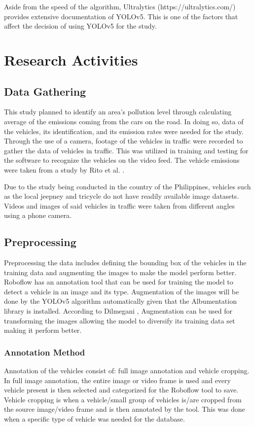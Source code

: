 Aside from the speed of the algorithm, Ultralytics (https://ultralytics.com/) provides extensive documentation of YOLOv5. This is one of the factors that affect the decision of using YOLOv5 for the study.


\section{Research Activities}


\subsection {Data Gathering}
This study planned to identify an area’s pollution level through calculating average of the emissions coming from the cars on the road. In doing so, data of the vehicles, its identification, and its emission rates were needed for the study. Through the use of a camera, footage of the vehicles in traffic were recorded to gather the data of vehicles in traffic. This was utilized in training and testing for the software to recognize the vehicles on the video feed. The vehicle emissions were taken from a study by Rito et al. \citeyear{rito_lopez_biona_2021}.

Due to the study being conducted in the country of the Philippines, vehicles such as the local jeepney and tricycle do not have readily available image datasets. Videos and images of said vehicles in traffic were taken from different angles using a phone camera. 


\subsection {Preprocessing}

	Preprocessing the data includes defining the bounding box of the vehicles in the training data and augmenting the images to make the model perform better. Roboflow has an annotation tool that can be used for  training the model to detect a vehicle in an image and its type. Augmentation of the images will be done by the YOLOv5 algorithm automatically given that the Albumentation library is installed. According to Dilmegani \citeyear{dilmegani}, Augmentation can be used for transforming the images allowing the model to diversify its training data set making it perform better.
	

	
\subsubsection{Annotation Method}
Annotation of the vehicles consist of: full image annotation and vehicle cropping. In full image annotation, the entire image or video frame is used and every vehicle present is then selected and categorized for the Roboflow tool to save. Vehicle cropping is when a vehicle/small group of vehicles is/are cropped from the source image/video frame and is then annotated by the tool. This was done when a specific type of vehicle was needed for the database.

